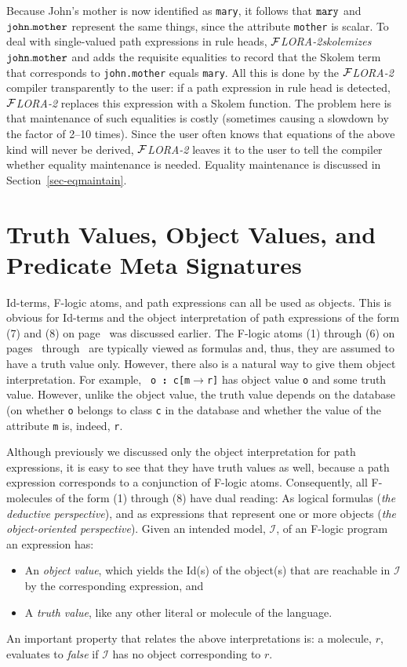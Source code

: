 \documentclass[11pt]{article}
\newcommand{\db}[1]{\ensuremath{\mathcal{#1}}}
\newcommand{\isa}{\,{\bf{:}}\,}
\newcommand{\fd}{\ensuremath{{\rightarrow}}}                   %
\newcommand{\FLORA}{{\mbox{${\cal F}${\small\it LORA}\rm\emph{-2}}}\xspace}
\newcommand{\fl}{\mbox{F-logic}\xspace}
\begin{document}
Because John's mother is now identified as {\tt mary}, it follows that
${\tt mary}$ and ${\tt john.mother}$ represent the same things, since the
attribute {\tt mother} is scalar. To deal with single-valued path
expressions in rule heads, \FLORA \emph{skolemizes} ${\tt john.mother}$ and
adds the requisite equalities to record that the Skolem term that
corresponds to {\tt john.mother} equals {\tt mary}.  All this is done by
the \FLORA compiler transparently to the user: if a path expression in rule
head is detected, \FLORA replaces this expression with a Skolem function.
The problem here is that maintenance of such equalities is costly
(sometimes causing a slowdown by the factor of 2--10 times). Since the user
often knows that equations of the above kind will never be derived, \FLORA
leaves it to the user to tell the compiler whether equality maintenance is
needed.  Equality maintenance is discussed in Section~\ref{sec-eqmaintain}.


\section{Truth Values, Object Values, and Predicate Meta Signatures}
\label{sec-references}


Id-terms, \fl atoms, and path expressions can all be used as objects. This
is obvious for Id-terms and the object interpretation of path expressions
of the form (7) and (8) on page~\pageref{eq-path-fun} was discussed
earlier. The \fl atoms (1) through (6) on pages~\pageref{eq-scalar-atom}
through~\pageref{eq-subclass} are typically viewed as formulas and, thus,
they are assumed to have a truth value only.  However, there also is a
natural way to give them object interpretation.  For example, {\tt
  o{\isa}c[m{\fd}r]} has object value {\tt o} and some truth value.
However, unlike the object value, the truth value depends on the database
(on whether {\tt o} belongs to class {\tt c} in the database and whether
the value of the attribute {\tt m} is, indeed, {\tt r}.

Although previously we discussed only the object interpretation for path
expressions, it is easy to see that they have truth values as well, because
a path expression corresponds to a conjunction of F-logic atoms.
Consequently, all F-molecules of the form (1) through (8) have dual
reading: As logical formulas (\emph{the deductive perspective}), and as
expressions that represent one or more objects (\emph{the object-oriented
  perspective}).  Given an intended model, \db I, of an \fl program an
expression has:
\begin{itemize}
\item An \emph{object value}, which yields the Id(s) of the object(s)
  that are reachable in \db I by the corresponding expression, and 
\item A \emph{truth value}, like any other literal or molecule of the
  language. 
\end{itemize}
An important property that relates the above interpretations is: a
molecule, $r$, evaluates to \emph{false} if \db I has no object
corresponding to $r$.
\end{document}
